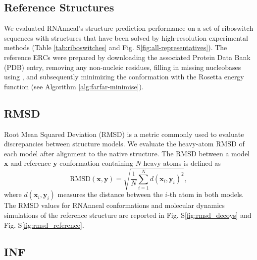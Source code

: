\documentclass[%
aip,
 amsmath,amssymb,
reprint,%
onecolumn,
]{revtex4-1}
\makeatletter
\newcommand\setcurrentname[1]{\def\@currentlabelname{#1}}
\makeatother
\begin{document}
{\subsection*{Reference Structures}
\setcurrentname{Reference Structures}
\label{methods:preparation}

We evaluated RNAnneal's structure prediction performance on a set of riboswitch sequences with structures that have been solved by high-resolution experimental methods (Table \ref{tab:riboswitches} and Fig. S\ref{fig:all-representatives}). The reference ERCs were prepared by downloading the associated Protein Data Bank (PDB) entry, removing any non-nucleic residues, filling in missing nucleobases using , and subsequently minimizing the conformation with the Rosetta energy function (see Algorithm \ref{alg:farfar-minimise}).

\subsection*{RMSD}
\setcurrentname{RMSD}
\label{methods:rmsd}

Root Mean Squared Deviation (RMSD) is a metric commonly used to evaluate discrepancies between structure models. We evaluate the heavy-atom RMSD of each model after alignment to the native structure. The RMSD between a model $\mathbf{x}$ and reference $\mathbf{y}$ conformation containing $N$ heavy atoms is defined as
\begin{equation}
    \mathrm{RMSD}(\mathbf{x}, \mathbf{y}) = \sqrt{\frac{1}{N}\sum_{i=1}^N d(\mathbf{x}_i, \mathbf{y}_i)^2},
\end{equation}
where $d(\mathbf{x}_i, \mathbf{y}_i)$ measures the distance between the $i$-th atom in both models. The RMSD values for RNAnneal conformations and molecular dynamics simulations of the reference structure are reported in Fig. S\ref{fig:rmsd_decoys} and Fig. S\ref{fig:rmsd_reference}. 

\subsection*{INF}
       \setcurrentname{INF}
\label{methods:inf}

}
\end{document}
